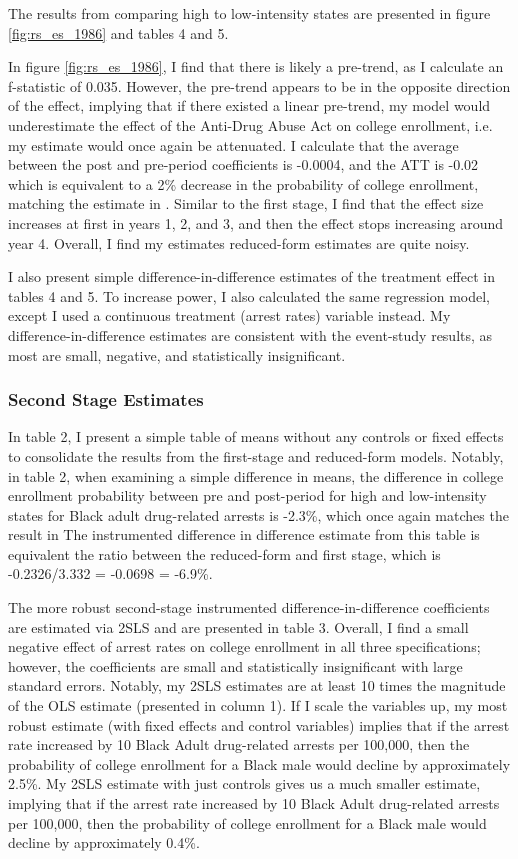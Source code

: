 \documentclass{article}
\begin{document}
The results from comparing high to low-intensity states are presented in figure \ref{fig:rs_es_1986} and tables 4 and 5. 

In figure \ref{fig:rs_es_1986}, I find that there is likely a pre-trend, as I calculate an f-statistic of 0.035. However, the pre-trend appears to be in the opposite direction of the effect, implying that if there existed a linear pre-trend, my model would underestimate the effect of the Anti-Drug Abuse Act on college enrollment, i.e. my estimate would once again be attenuated. I calculate that the average between the post and pre-period coefficients is -0.0004, and the ATT is -0.02 which is equivalent to a 2\% decrease in the probability of college enrollment, matching the estimate in \cite{britton2022}. Similar to the first stage, I find that the effect size increases at first in years 1, 2, and 3, and then the effect stops increasing around year 4. Overall, I find my estimates reduced-form estimates are quite noisy.

I also present simple difference-in-difference estimates of the treatment effect in tables 4 and 5. To increase power, I also calculated the same regression model, except I used a continuous treatment (arrest rates) variable instead. My difference-in-difference estimates are consistent with the event-study results, as most are small, negative, and statistically insignificant.

\subsubsection{Second Stage Estimates}

In table 2, I present a simple table of means without any controls or fixed effects to consolidate the results from the first-stage and reduced-form models. Notably, in table 2, when examining a simple difference in means, the difference in college enrollment probability between pre and post-period for high and low-intensity states for Black adult drug-related arrests is -2.3\%, which once again matches the result in \cite{britton2022} The instrumented difference in difference estimate from this table is equivalent the ratio between the reduced-form and first stage, which is -0.2326/3.332 = -0.0698 = -6.9\%.

The more robust second-stage instrumented difference-in-difference coefficients are estimated via 2SLS and are presented in table 3. Overall, I find a small negative effect of arrest rates on college enrollment in all three specifications; however, the coefficients are small and statistically insignificant with large standard errors. Notably, my 2SLS estimates are at least 10 times the magnitude of the OLS estimate (presented in column 1). If I scale the variables up, my most robust estimate (with fixed effects and control variables) implies that if the arrest rate increased by 10 Black Adult drug-related arrests per 100,000, then the probability of college enrollment for a Black male would decline by approximately 2.5\%. My 2SLS estimate with just controls gives us a much smaller estimate, implying that if the arrest rate increased by 10 Black Adult drug-related arrests per 100,000, then the probability of college enrollment for a Black male would decline by approximately 0.4\%.
\end{document}
